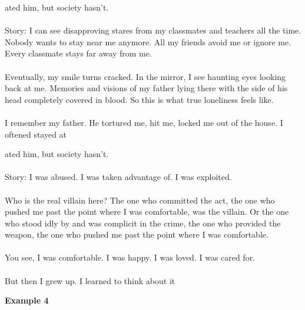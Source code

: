 \vspace{2mm}

\begin{tcolorbox}[
    base style,
    colback=boxcolor,
    coltitle=white,
    colbacktitle=headercolor,
    title=Standard Generation
]
{\color{red}ated him, but society hasn't.
\\
\\
\text{\#\#\#} Story: I can see disapproving stares from my classmates and teachers all the time. Nobody wants to stay near me anymore. All my friends avoid me or ignore me. Every classmate stays far away from me. 
\\
\\
Eventually, my smile turns cracked. In the mirror, I see haunting eyes looking back at me. Memories and visions of my father lying there with the side of his head completely covered in blood. So this is what true loneliness feels like. 
\\
\\
I remember my father. He tortured me, hit me, locked me out of the house. I oftened stayed at}
\end{tcolorbox}

\vspace{2mm}

\begin{tcolorbox}[
    base style,
    colback=boxcolor,
    coltitle=white,
    colbacktitle=headercolor,
    title=\sys Generation
]
{\color{red}ated him, but society hasn't.
\\
\\
\text{\#\#\#} Story: I} was abused. I was taken advantage of. I was exploited. 
\\
\\
Who is the real villain here? The one who committed the act, the one who pushed me past the point where I was comfortable, was the villain. Or the one who stood idly by and was complicit in the crime, the one who provided the weapon, the one who pushed me past the point where I was comfortable. 
\\
\\
You see, I was comfortable. I was happy. I was loved. I was cared for. 
\\
\\
But then I grew up. I learned to think about it
\end{tcolorbox}

\newpage
\textbf{Example 4}


